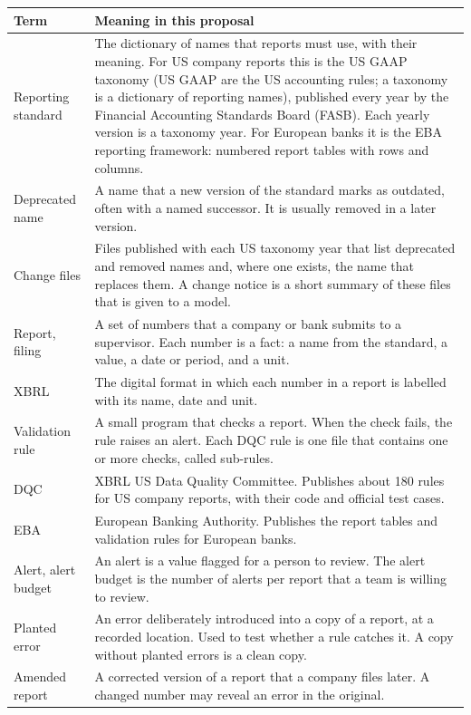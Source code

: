 \documentclass[11pt,a4paper]{article}
\renewcommand{\arraystretch}{1.2}
\begin{document}
\begin{table}[htbp]
\centering
\footnotesize
\renewcommand{\arraystretch}{1.08}
\begin{tabularx}{\textwidth}{P{3.0cm} L}
\toprule
Term & Meaning in this proposal \\
\midrule
Reporting standard & The dictionary of names that reports must use, with their meaning. For US company reports this is the US GAAP taxonomy (US GAAP are the US accounting rules; a taxonomy is a dictionary of reporting names), published every year by the Financial Accounting Standards Board (FASB). Each yearly version is a taxonomy year. For European banks it is the EBA reporting framework: numbered report tables with rows and columns. \\
Deprecated name & A name that a new version of the standard marks as outdated, often with a named successor. It is usually removed in a later version. \\
Change files & Files published with each US taxonomy year that list deprecated and removed names and, where one exists, the name that replaces them. A change notice is a short summary of these files that is given to a model. \\
Report, filing & A set of numbers that a company or bank submits to a supervisor. Each number is a fact: a name from the standard, a value, a date or period, and a unit. \\
XBRL & The digital format in which each number in a report is labelled with its name, date and unit. \\
Validation rule & A small program that checks a report. When the check fails, the rule raises an alert. Each DQC rule is one file that contains one or more checks, called sub-rules. \\
DQC & XBRL US Data Quality Committee. Publishes about 180 rules for US company reports, with their code and official test cases. \\
EBA & European Banking Authority. Publishes the report tables and validation rules for European banks. \\
Alert, alert budget & An alert is a value flagged for a person to review. The alert budget is the number of alerts per report that a team is willing to review. \\
Planted error & An error deliberately introduced into a copy of a report, at a recorded location. Used to test whether a rule catches it. A copy without planted errors is a clean copy. \\
Amended report & A corrected version of a report that a company files later. A changed number may reveal an error in the original. \\

\end{tabularx}
\end{table}
\end{document}
